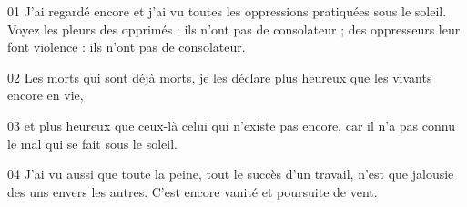 01 J’ai regardé encore et j’ai vu toutes les oppressions pratiquées sous le soleil. Voyez les pleurs des opprimés : ils n’ont pas de consolateur ; des oppresseurs leur font violence : ils n’ont pas de consolateur.

02 Les morts qui sont déjà morts, je les déclare plus heureux que les vivants encore en vie,

03 et plus heureux que ceux-là celui qui n’existe pas encore, car il n’a pas connu le mal qui se fait sous le soleil.

04 J’ai vu aussi que toute la peine, tout le succès d’un travail, n’est que jalousie des uns envers les autres. C’est encore vanité et poursuite de vent.
